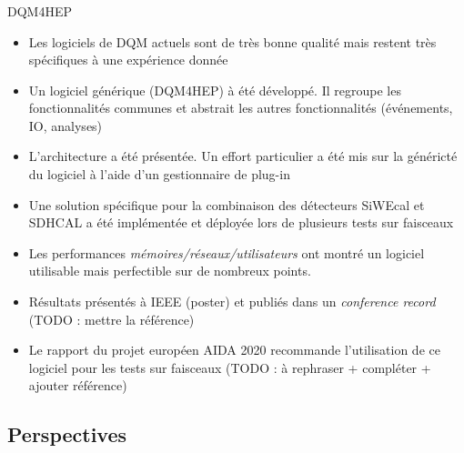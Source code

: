 \documentclass[8pt]{beamer}
\begin{document}
  \begin{frame}
  \frametitle{\secname}
  \framesubtitle{\subsecname}
    \begin{block}{DQM4HEP}
      \begin{itemize}
        \item Les logiciels de DQM actuels sont de très bonne qualité mais restent très spécifiques à une expérience donnée
        \item Un logiciel générique (DQM4HEP) à été développé. Il regroupe les fonctionnalités communes et abstrait les autres fonctionnalités (événements, IO, analyses)
        \item L'architecture a été présentée. Un effort particulier a été mis sur la généricté du logiciel à l'aide d'un gestionnaire de plug-in
        \item Une solution spécifique pour la combinaison des détecteurs SiWEcal et SDHCAL a été implémentée et déployée lors de plusieurs tests sur faisceaux
        \item Les performances \textit{mémoires/réseaux/utilisateurs} ont montré un logiciel utilisable mais perfectible sur de nombreux points.
        \item Résultats présentés à IEEE (poster) et publiés dans un \textit{conference record} (TODO : mettre la référence)
        \item Le rapport du projet européen AIDA 2020 recommande l'utilisation de ce logiciel pour les tests sur faisceaux (TODO : à rephraser + compléter + ajouter référence)
      \end{itemize}
    \end{block}
  \end{frame}

  \subsection*{Perspectives}
\end{document}
